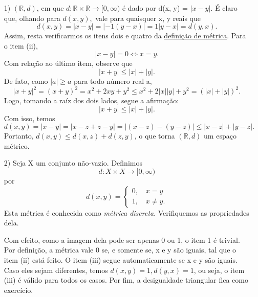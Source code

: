 \documentclass[MetricSpaces/metric_notes.tex]{subfiles}
\begin{document}
\begin{example}
	\begin{itemize}

		\item[1)] \((\mathbb{R}, d)\), em que \(d:\mathbb{R}\times \mathbb{R}\rightarrow [0, \infty)\) é dado por
		      d(x, y) = \(|x-y|.\) É claro que, olhando para \(d(x,y),\) vale para quaisquer x, y reais que
		      \[
			      d(x, y) = |x-y| = |-1(y-x)| = 1|y-x| = d(y, x).
		      \]
		      Assim, resta verificarmos os itens dois e quatro da \hyperlink{def_metric}{definição de métrica}. Para o item (ii),
		      \[
			      |x-y| = 0 \Longleftrightarrow x = y.
		      \]
		      Com relação ao último item, observe que
		      \[
			      |x+y|\leq |x| + |y|.
		      \]
		      De fato, como \(|a|\geq a\) para todo número real a,
		      \[
			      |x+y|^{2} = (x+y)^{2} = x^{2} + 2xy +y^{2}\leq x^{2} + 2|x||y| + y^{2} = (|x| + |y|)^{2}.
		      \]
		      Logo, tomando a raíz dos dois lados, segue a afirmação:
		      \[
			      |x+y|\leq |x| + |y|.
		      \]
		      Com isso, temos
		      \[
			      d(x, y) = |x-y| = |x-z+z-y| = |(x-z)-(y-z)|\leq |x-z| + |y-z|.
		      \]
		      Portanto, \(d(x, y)\leq d(x, z) + d(z, y)\), o que torna \((\mathbb{R}, d)\) um espaço métrico.

		\item[2)] Seja X um conjunto não-vazio. Definimos
		      \[
			      d:X\times X\rightarrow [0, \infty)
		      \]
		      por
		      \[
			      d(x, y) = \left\{\begin{array}{ll}
				      0,\quad x = y \\
				      1,\quad x\neq y.
			      \end{array}\right.
		      \]
		      Esta métrica é conhecida como \textit{métrica discreta}. Verifiquemos as propriedades dela.

		      Com efeito, como a imagem dela pode ser apenas 0 ou 1, o item 1 é trivial. Por definição, a métrica vale 0 se,
		      e somente se, x e y são iguais, tal que o item (ii) está feito. O item (iii) segue automaticamente se x e y são iguais. Caso
		      eles sejam diferentes, temos \(d(x, y) = 1, d(y, x) = 1\), ou seja, o item (iii) é válido para todos os casos. Por fim, a desigualdade triangular fica como exercício.
	\end{itemize}
\end{example}
\end{document}
